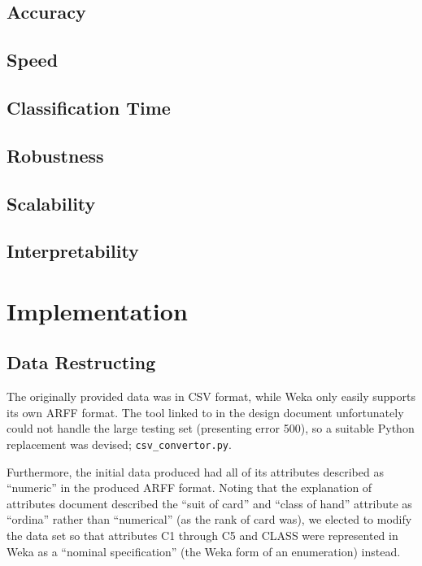 \documentclass[11pt, a4paper]{article}
\begin{document}
\subsection*{Accuracy}

\subsection*{Speed}

\subsection*{Classification Time}

\subsection*{Robustness}

\subsection*{Scalability}

\subsection*{Interpretability}


\section*{Implementation}

\subsection*{Data Restructing}

The originally provided data was in CSV format, while Weka only easily supports its own ARFF format. The tool linked to in the design document \cite{arffconv} unfortunately could not handle the large testing set (presenting error 500), so a suitable Python replacement was devised; \texttt{csv\_convertor.py}.

Furthermore, the initial data produced had all of its attributes described as ``numeric'' in the produced ARFF format. Noting that the explanation of attributes document \cite{expattr} described the ``suit of card'' and ``class of hand'' attribute as ``ordina'' rather than ``numerical'' (as the rank of card was), we elected to modify the data set so that attributes C1 through C5 and CLASS were represented in Weka as a ``nominal specification'' (the Weka form of an enumeration) instead.
\end{document}
